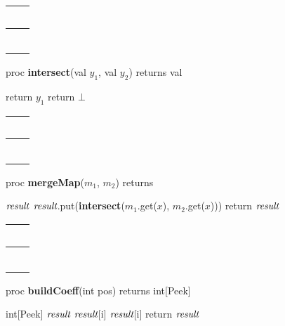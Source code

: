 \begin{algorithm}
\begin{tabular}{l}
~\hspace{3in}~ \\
\hline \\
~\hspace{3in}~ 
\end{tabular}
proc {\bf intersect}(val $y_1$, val $y_2$) returns val
\begin{algorithmic}
\STATE return $y_1$
\ELSE
\STATE return $\bot$
\ENDIF
\end{algorithmic}
\begin{tabular}{l}
~\hspace{3in}~ \\
\hline \\
~\hspace{3in}~ 
\end{tabular}
proc {\bf mergeMap}(\maptype $m_1$, \maptype $m_2$) returns \maptype
\begin{algorithmic}
\STATE \maptype $\mbox{\it result}$
\STATE $\mbox{\it result}$.put({\bf intersect}($m_1$.get($x$), $m_2$.get($x$)))
\ENDFOR
\STATE return $\mbox{\it result}$
\end{algorithmic}
\begin{tabular}{l}
~\hspace{3in}~ \\
\hline \\
~\hspace{3in}~ 
\end{tabular}
proc {\bf buildCoeff}(int pos) returns int[Peek]
\begin{algorithmic}
\STATE int[Peek] $\mbox{\it result}$
\STATE $\mbox{\it result}$[i] 
\ELSE
\STATE $\mbox{\it result}$[i] 
\ENDIF
\ENDFOR
\STATE return $\mbox{\it result}$
\end{algorithmic}
\end{algorithm}

